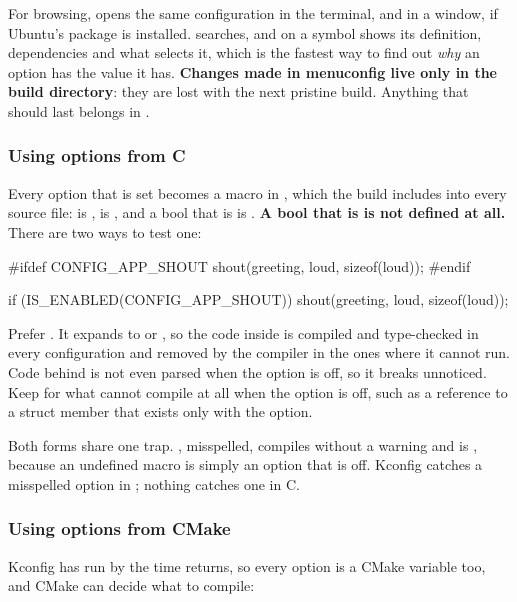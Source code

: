 \noindent For browsing,  opens the same configuration in the
terminal, and  in a window, if Ubuntu’s  package is
installed. \code{/} searches, and  on a symbol shows its definition, dependencies and what
selects it, which is the fastest way to find out \emph{why} an option has the value it has.
\textbf{Changes made in menuconfig live only in the build directory}: they are lost with the next
pristine build. Anything that should last belongs in .

\subsubsection{Using options from C}
Every option that is set becomes a macro in , which the build includes into every
source file:  is ,  is
, and a bool that is  is . \textbf{A bool that is
 is not defined at all.} There are two ways to test one:

\begin{ccode}
#ifdef CONFIG_APP_SHOUT
	shout(greeting, loud, sizeof(loud));
#endif

if (IS_ENABLED(CONFIG_APP_SHOUT)) {
	shout(greeting, loud, sizeof(loud));
}
\end{ccode}

\noindent Prefer \textbf{}. It expands to  or , so the code
inside is compiled and type-checked in every configuration and removed by the compiler in the ones
where it cannot run. Code behind  is not even parsed when the option is off, so it
breaks unnoticed. Keep  for what cannot compile at all when the option is off, such as
a reference to a struct member that exists only with the option.

Both forms share one trap. , misspelled, compiles without a
warning and is , because an undefined macro is simply an option that is off. Kconfig catches
a misspelled option in ; nothing catches one in C.

\subsubsection{Using options from CMake}
Kconfig has run by the time  returns, so every option is a CMake variable
too, and CMake can decide what to compile:

